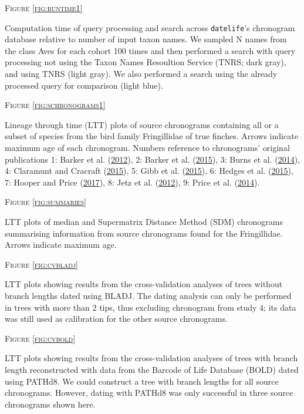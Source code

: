 \documentclass[]{article}
\begin{document}
\begin{center}
\textsc{Figure \ref{fig:runtime1}}
\end{center}
Computation time of query processing and search across \texttt{datelife}'s chronogram database relative to number of input taxon names. We sampled N names from the class Aves for each cohort 100 times and then performed a search with query processing not using the Taxon Names Resoultion Service (TNRS; dark gray), and using TNRS (light gray). We also performed a search using the already processed query for comparison (light blue). 

\begin{center}
\textsc{Figure \ref{fig:schronograms1}}
\end{center}
Lineage through time (LTT) plots of source chronograms containing all or a subset of species from the bird family Fringillidae of true finches. Arrows indicate maximum age of each chronogram. Numbers reference to chronograms' original publications 1: Barker et al. (\protect\hyperlink{ref-barker2012going}{2012}), 2: Barker et al. (\protect\hyperlink{ref-barker2015new}{2015}), 3: Burns et al. (\protect\hyperlink{ref-burns2014phylogenetics}{2014}), 4: Claramunt and Cracraft (\protect\hyperlink{ref-claramunt2015new}{2015}), 5: Gibb et al. (\protect\hyperlink{ref-gibb2015new}{2015}), 6: Hedges et al. (\protect\hyperlink{ref-Hedges2015}{2015}), 7: Hooper and Price (\protect\hyperlink{ref-hooper2017chromosomal}{2017}), 8: Jetz et al. (\protect\hyperlink{ref-Jetz2012}{2012}), 9: Price et al. (\protect\hyperlink{ref-price2014niche}{2014}).

\begin{center}
\textsc{Figure \ref{fig:summaries}}
\end{center}
LTT plots of median and Supermatrix Distance Method (SDM) chronograms summarising information from source chronograms found for the Fringillidae. Arrows indicate maximum age.

\begin{center}
\textsc{Figure \ref{fig:cvbladj}}
\end{center}
LTT plots showing results from the cross-validation analyses of trees without branch lengths dated using BLADJ. The dating analysis can only be performed in trees with more than 2 tips, thus excluding chronogram from study 4; its data was still used as calibration for the other source chronograms.

\begin{center}
\textsc{Figure \ref{fig:cvbold}}
\end{center}
LTT plots showing results from the cross-validation analyses of trees with branch length reconstructed with data from the Barcode of Life Database (BOLD) dated using PATHd8. We could construct a tree with branch lengths for all source chronograms. However, dating with PATHd8 was only successful in three source chronograms shown here.
\end{document}

